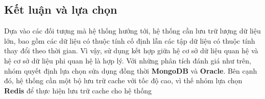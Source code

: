 \subsection{Kết luận và lựa chọn}
Dựa vào các đối tượng mà hệ thống hướng tới, hệ thống cần lưu trữ lượng dữ liệu lớn, bao gồm các dữ liệu có thuộc tính cố định lẫn các tập dữ liệu có thuộc tính thay đổi theo thời gian. Vì vậy, sử dụng kết hợp giữa hệ cơ sở dữ liệu quan hệ và hệ cơ sở dữ liệu phi quan hệ là hợp lý. Với những phân tích đánh giá như trên, nhóm quyết định lựa chọn sửa dụng đồng thời \textbf{MongoDB} và \textbf{Oracle}. Bên cạnh đó, hệ thống cần một bộ lưu trữ cache với tốc độ  cao, vì thế nhóm lựa chọn \textbf{Redis} để thực hiện lưu trữ cache cho hệ thống